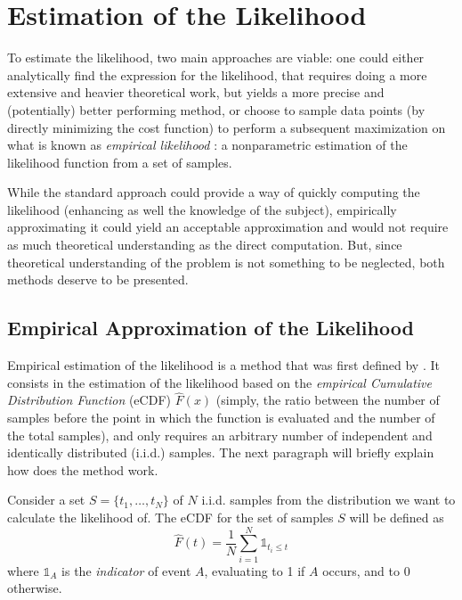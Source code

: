 \section{Estimation of the Likelihood}
\label{sec:lik_est}
To estimate the likelihood, two main approaches are viable:
one could either analytically find the expression for the likelihood,
that requires doing a more extensive and heavier theoretical work,
but yields a more precise and (potentially) better performing method,
or choose to sample data points (by directly minimizing the cost function)
to perform a subsequent maximization on what is known as \textit{empirical likelihood} \parencite{10.1093/biomet/75.2.237}:
a nonparametric estimation of the likelihood function from a set of samples.

While the standard approach could provide a way of quickly computing the likelihood
(enhancing as well the knowledge of the subject),
empirically approximating it could yield an acceptable approximation and would not require as much theoretical understanding as the direct computation.
But, since theoretical understanding of the problem is not something to be neglected,
both methods deserve to be presented.

\subsection{Empirical Approximation of the Likelihood}
\label{sec:emp_approx_lik}

Empirical estimation of the likelihood is a method that was first defined by \textcite{10.1093/biomet/75.2.237}.
It consists in the estimation of the likelihood based on the \textit{empirical Cumulative Distribution Function} (eCDF)  \(\hat{F}(x)\) (simply, the ratio between the number of samples before the point in which the function is evaluated and the number of the total samples),
and only requires an arbitrary number of independent and identically distributed (i.i.d.) samples.
The next paragraph will briefly explain how does the method work.

Consider a set \(S = \{t_1, \dots, t_N\}\) of \(N\) i.i.d. samples from the distribution we want to calculate the likelihood of.
The eCDF for the set of samples \(S\) will be defined as
\begin{equation}
  \label{eq:emp_cdf}
  \hat{F}(t) = \frac{1}{N}\sum_{i = 1}^N \mathbb{1}_{t_i \leq t}
\end{equation}
where \(\mathbb{1}_A\) is the \textit{indicator} of event \(A\),
evaluating to 1 if \(A\) occurs, and to 0 otherwise.

